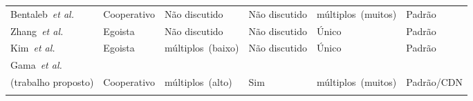 \begin{table}[htb]
\begin{tabular}{p{2.8cm}p{2cm}p{2.3cm}p{2.2cm}p{2.6cm}p{1.5cm}}

    Bentaleb~\textit{et al.}~\cite{bentaleb:2018:MSys} &
    Cooperativo & Não discutido & Não discutido & múltiplos~(muitos) & Padrão \\
    \addlinespace
	\addlinespace
	
    Zhang~\textit{et al.}~\cite{zhangINFOCOM17} &
    Egoista & Não discutido & Não discutido & Único & Padrão \\
    \addlinespace
	\addlinespace
	
    Kim~\textit{et al.}~\cite{Kim2018} &
    Egoista & múltiplos~(baixo) & Não discutido & Único & Padrão \\
    \addlinespace

    \midrule
	\addlinespace
    Gama~\textit{et al.} \\ (trabalho proposto) &
    Cooperativo & múltiplos~(alto) & Sim & múltiplos~(muitos) & Padrão/CDN \\
    \addlinespace
    \bottomrule
    
  \end{tabular}
\end{table}
